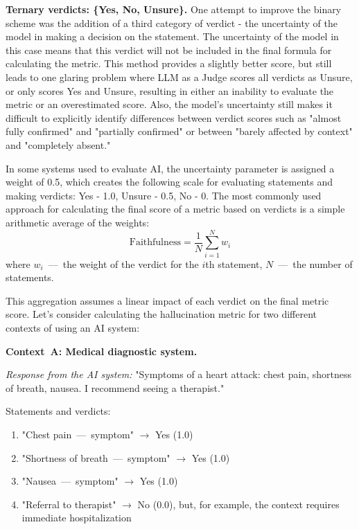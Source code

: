 \documentclass[sn-basic]{sn-jnl}
\theoremstyle{thmstyleone}%
\theoremstyle{thmstyletwo}%
\theoremstyle{thmstylethree}%
\begin{document}
\textbf{Ternary verdicts: \{Yes, No, Unsure\}.} One attempt to improve the binary scheme was the addition of a third category of verdict - the uncertainty of the model in making a decision on the statement. The uncertainty of the model in this case means that this verdict will not be included in the final formula for calculating the metric. This method provides a slightly better score, but still leads to one glaring problem where LLM as a Judge scores all verdicts as Unsure, or only scores Yes and Unsure, resulting in either an inability to evaluate the metric or an overestimated score. Also, the model's uncertainty still makes it difficult to explicitly identify differences between verdict scores such as "almost fully confirmed" and "partially confirmed" or between "barely affected by context" and "completely absent."

In some systems used to evaluate AI, the uncertainty parameter is assigned a weight of 0.5, which creates the following scale for evaluating statements and making verdicts: Yes - 1.0, Unsure - 0.5, No - 0. The most commonly used approach for calculating the final score of a metric based on verdicts is a simple arithmetic average of the weights: 
\begin{equation} 
\text{Faithfulness} = \frac{1}{N} \sum_{i=1}^N w_i 
\end{equation} 
where $w_i$~---~the weight of the verdict for the $i$th statement, $N$~---~the number of statements.

This aggregation assumes a linear impact of each verdict on the final metric score. Let's consider calculating the hallucination metric for two different contexts of using an AI system:

\textbf{Context~A: Medical diagnostic system.}

\textit{Response from the AI system:} "Symptoms of a heart attack: chest pain, shortness of breath, nausea. I recommend seeing a therapist."

Statements and verdicts: 
\begin{enumerate} 
\item "Chest pain~---~symptom" $\to$ Yes (1.0) 
\item "Shortness of breath~---~symptom" $\to$ Yes (1.0) 
\item "Nausea~---~symptom" $\to$ Yes (1.0) 
\item "Referral to therapist" $\to$ No (0.0), but, for example, the context requires immediate hospitalization 
\end{enumerate}
\end{document}
